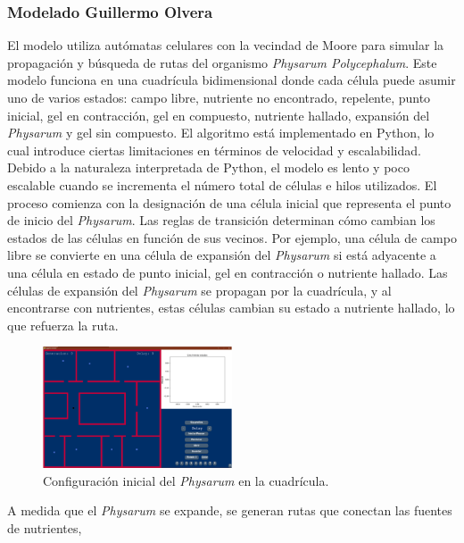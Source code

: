 \subsubsection{Modelado Guillermo Olvera} %
\label{ssub:ModeladoGuillermoOlvera}
    El modelo utiliza aut\'omatas celulares con la vecindad de Moore para simular la propagaci\'on y b\'usqueda de rutas del organismo 
        \textit{Physarum Polycephalum}. Este modelo funciona en una cuadr\'icula bidimensional donde cada c\'elula puede asumir 
        uno de varios estados: campo libre, nutriente no encontrado, repelente, punto inicial, gel en contracci\'on, 
        gel en compuesto, nutriente hallado, expansi\'on del \textit{Physarum} y gel sin compuesto.
    \vskip 0.5cm
    El algoritmo est\'a implementado en Python, lo cual introduce ciertas limitaciones en t\'erminos de 
        velocidad y escalabilidad. Debido a la naturaleza interpretada de Python, el modelo es lento 
        y poco escalable cuando se incrementa el n\'umero total de c\'elulas e hilos utilizados.
    \vskip 0.5cm
    El proceso comienza con la designaci\'on de una c\'elula inicial que representa el punto de inicio del \textit{Physarum}. 
        Las reglas de transici\'on determinan c\'omo cambian los estados de las c\'elulas en funci\'on de sus vecinos. Por ejemplo, 
        una c\'elula de campo libre se convierte en una c\'elula de expansi\'on del \textit{Physarum} si est\'a adyacente a una 
        c\'elula en estado de punto inicial, gel en contracci\'on o nutriente hallado. Las c\'elulas de expansi\'on del \textit{Physarum} 
        se propagan por la cuadr\'icula, y al encontrarse con nutrientes, estas c\'elulas cambian su estado a nutriente hallado, 
        lo que refuerza la ruta.
    \vskip 0.5cm
    \begin{figure}[h]
        \centering
        \includegraphics[width=0.5\textwidth]{./images/estado_del_arte/physarum/estadoInicialOlvera.png}
        \caption{Configuraci\'on inicial del \textit{Physarum} en la cuadr\'icula.}
        \label{fig:initial_state}
    \end{figure}
    \vskip 0.5cm
    A medida que el \textit{Physarum} se expande, se generan rutas que conectan las fuentes de nutrientes, 

